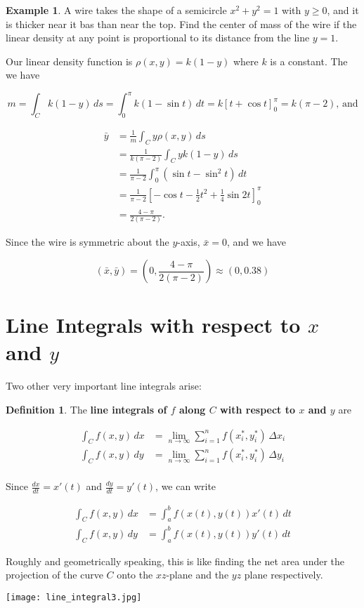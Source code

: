 \documentclass[11pt,oneside,english]{amsart}
\theoremstyle{definition}
\newtheorem*{example}{Example}
\newtheorem*{definition}{Definition}
\newcommand{\lom}[2]{\lim_{{#1}\rightarrow{#2}}}
\newcommand{\dd}[2]{\frac{d{#1}}{d{#2}}}
\begin{document}
\begin{example}
A wire takes the shape of a semicircle  $x^2+y^2=1$ with $y\geq 0$, and it is thicker near it bas than near the top. Find the center of mass of the wire if the linear density at any point is proportional to its distance from the line $y=1$.

Our linear density function is $\rho(x,y)=k(1-y)$ where $k$ is a constant. The we have

\[
m=\int_Ck(1-y)\,ds=\int_0^\pi k(1-\sin t)\,dt=k\left[t+\cos t\right]_0^\pi=k(\pi-2)\text{, and}
\]

\begin{align*}
\bar{y}&=\frac{1}{m}\int_Cy\rho(x,y)\,ds\\[2mm]
&=\frac{1}{k(\pi-2)}\int_Cyk(1-y)\,ds\\[2mm]
&=\frac{1}{\pi-2}\int_0^\pi(\sin t-\sin^2t)\,dt\\[2mm]
&=\frac{1}{\pi-2}\left[-\cos t-\frac{1}{2}t^2+\frac{1}{4}\sin2t\right]_0^\pi\\[2mm]
&=\frac{4-\pi}{2(\pi-2)}.
\end{align*}

Since the wire is symmetric about the $y$-axis, $\bar{x}=0$, and we have

\[
(\bar{x},\bar{y})=\left(0,\frac{4-\pi}{2(\pi-2)}\right)\approx(0,0.38)
\]
\end{example}

\vfill
\pagebreak

\section*{Line Integrals with respect to $x$ and $y$}

Two other very important line integrals arise:

\begin{definition}
The \textbf{line integrals of $f$ along $C$ with respect to $x$ and $y$} are

\begin{align*}
\int_Cf(x,y)\,dx&=\lom{n}{\infty}\sum_{i=1}^nf(x_i^*,y_i^*)\,\Delta x_i\\[2mm]
\int_Cf(x,y)\,dy&=\lom{n}{\infty}\sum_{i=1}^nf(x_i^*,y_i^*)\,\Delta y_i\\[2mm]
\end{align*}

Since $\dd{x}{t}=x'(t)$ and $\dd{y}{t}=y'(t)$, we can write


\begin{align*}
\int_Cf(x,y)\,dx&=\int_a^bf(x(t),y(t))x'(t)\,dt\\[2mm]
\int_Cf(x,y)\,dy&=\int_a^bf(x(t),y(t))y'(t)\,dt
\end{align*}

Roughly and geometrically speaking, this is like finding the net area under the projection of the curve $C$ onto the $xz$-plane and the $yz$ plane respectively.

\begin{center}
\texttt{[image: line\_integral3.jpg]}
\end{center}
\end{definition}
\end{document}
